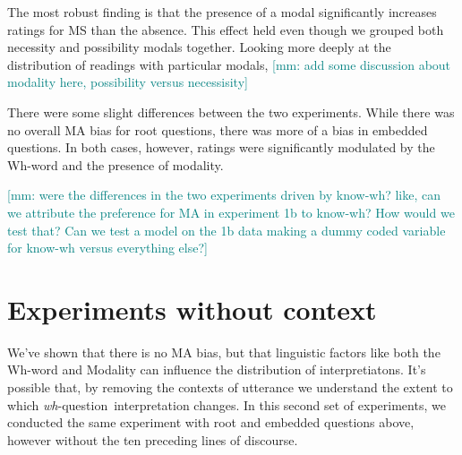 \documentclass[12pt,letterpaper,table,svgnames,dvipsnames]{article}
\newcommand{\mm}[1]{\textcolor{teal}{[mm: #1]}}
\newcommand{\whq}{\emph{wh}-question~}
\begin{document}

The most robust finding is that the presence of a modal significantly increases ratings for MS than the absence. This effect held even though we grouped both necessity and possibility modals together. Looking more deeply at the distribution of readings with particular modals, \mm{add some discussion about modality here, possibility versus necessisity}



There were some slight differences between the two experiments. While there was no overall MA bias for root questions, there was more of a bias in embedded questions. In both cases, however, ratings were significantly modulated by the Wh-word and the presence of modality. 


\mm{were the differences in the two experiments driven by know-wh? like, can we attribute the preference for MA in experiment 1b to know-wh? How would we test that? Can we test a model on the 1b data making a dummy coded variable for know-wh versus everything else?}













\section{Experiments without context}
We've shown that there is no MA bias, but that linguistic factors like both the Wh-word and Modality can influence the distribution of interpretiatons. It's possible that, by removing the contexts of utterance we understand the extent to which \whq interpretation changes. In this second set of experiments, we conducted the same experiment with root and embedded questions above, however without the ten preceding lines of discourse.
\end{document}
